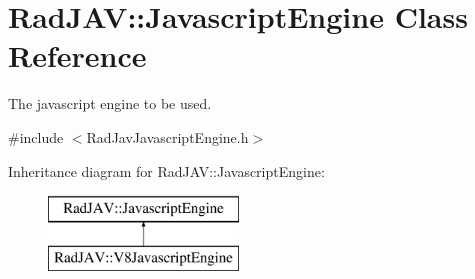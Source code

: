 \hypertarget{class_rad_j_a_v_1_1_javascript_engine}{}\section{Rad\+J\+AV\+:\+:Javascript\+Engine Class Reference}
\label{class_rad_j_a_v_1_1_javascript_engine}


The javascript engine to be used.  




{\ttfamily \#include $<$Rad\+Jav\+Javascript\+Engine.\+h$>$}

Inheritance diagram for Rad\+J\+AV\+:\+:Javascript\+Engine\+:\begin{figure}[H]
\begin{center}
\leavevmode
\includegraphics[height=2.000000cm]{class_rad_j_a_v_1_1_javascript_engine}
\end{center}
\end{figure}
